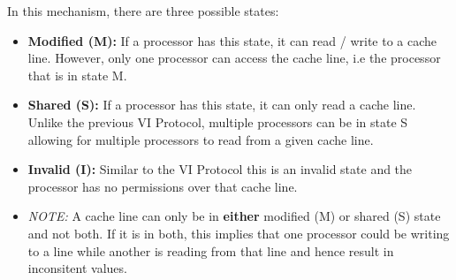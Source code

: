 \documentclass[12pt]{article}
\newenvironment{QandA}{\begin{enumerate}[label=\bfseries\arabic*.]\bfseries}
                      {\end{enumerate}}
\newenvironment{answered}{\par\quad\normalfont}{}
\begin{document}
\begin{QandA}
\begin{answered}
In this mechanism, there are three possible states:
\begin{itemize}
    \item \textbf{Modified (M):} If a processor has this state, it can read / write to a cache line. However, only one processor can access the cache line, i.e the processor that is in state M.
    \item \textbf{Shared (S):} If a processor has this state, it can only read a cache line. Unlike the previous VI Protocol, multiple processors can be in state S allowing for multiple processors to read from a given cache line.
    \item \textbf{Invalid (I):} Similar to the VI Protocol this is an invalid state and the processor has no permissions over that cache line.
    \item \textit{NOTE:} A cache line can only be in \textbf{either} modified (M) or shared (S) state and not both. If it is in both, this implies that one processor could be writing to a line while another is reading from that line and hence result in inconsitent values. 
\end{itemize}

\end{answered}

\end{QandA}
\end{document}
